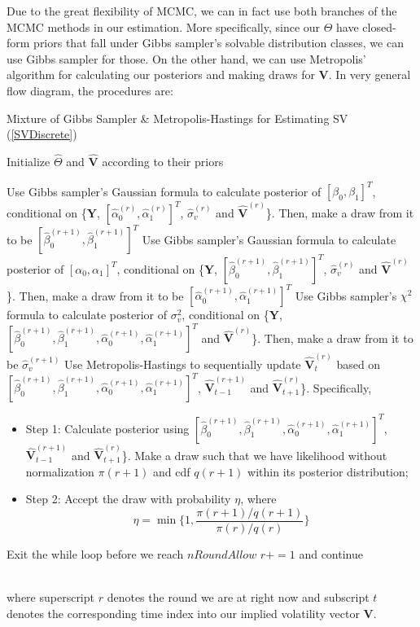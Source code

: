 \documentclass[letterpaper]{article}
\newcommand{\YY}{\mathbf{Y}}
\begin{document}
Due to the great flexibility of MCMC, we can in fact use both branches of the MCMC methods in our estimation. More specifically, since our $\Theta$ have closed-form priors that fall under Gibbs sampler's solvable distribution classes, we can use Gibbs sampler for those. On the other hand, we can use Metropolis' algorithm for calculating our posteriors and making draws for $\mathbf{V}$. In very general flow diagram, the procedures are:
\begin{algorithm}
	\caption{Mixture of Gibbs Sampler \& Metropolis-Hastings for Estimating SV (\ref{SVDiscrete})}
	\Input{Observations $\YY\in\mathbb{R}^{T}$}
	Initialize $\hat{\Theta}$ and $\hat{\mathbf{V}}$ according to their priors\;
	{
		Use Gibbs sampler's Gaussian formula to calculate posterior of $[\beta_0,\beta_1]^T$, conditional on \{$\YY$, $[\hat{\alpha}_0^{(r)},\hat{\alpha}_1^{(r)}]^T$, $\hat{\sigma}_v^{(r)}$ and $\hat{\mathbf{V}}^{(r)}$\}. Then, make a draw from it to be $[\hat{\beta}_0^{(r+1)},\hat{\beta}_1^{(r+1)}]^T$\;
		Use Gibbs sampler's Gaussian formula to calculate posterior of $[\alpha_0,\alpha_1]^T$, conditional on \{$\YY$,  $[\hat{\beta}_0^{(r+1)},\hat{\beta}_1^{(r+1)}]^T$, $\hat{\sigma}_v^{(r)}$ and $\hat{\mathbf{V}}^{(r)}$\}. Then, make a draw from it to be $[\hat{\alpha}_0^{(r+1)},\hat{\alpha}_1^{(r+1)}]^T$\;
		Use Gibbs sampler's $\chi^2$ formula to calculate posterior of $\sigma_v^2$, conditional on \{$\YY$,  $[\hat{\beta}_0^{(r+1)},\hat{\beta}_1^{(r+1)},\hat{\alpha}_0^{(r+1)},\hat{\alpha}_1^{(r+1)}]^T$ and $\hat{\mathbf{V}}^{(r)}$\}. Then, make a draw from it to be $\hat{\sigma}_v^{(r+1)}$\;
		Use Metropolis-Hastings to sequentially update $\hat{\mathbf{V}}^{(r)}_t$ based on $[\hat{\beta}_0^{(r+1)},\hat{\beta}_1^{(r+1)},\hat{\alpha}_0^{(r+1)},\hat{\alpha}_1^{(r+1)}]^T$, $\hat{\mathbf{V}}^{(r+1)}_{t-1}$ and $\hat{\mathbf{V}}^{(r)}_{t+1}$\}.  Specifically, 
		\begin{itemize}
			\item Step 1: Calculate posterior using $[\hat{\beta}_0^{(r+1)},\hat{\beta}_1^{(r+1)},\hat{\alpha}_0^{(r+1)},\hat{\alpha}_1^{(r+1)}]^T$, $\hat{\mathbf{V}}^{(r+1)}_{t-1}$ and $\hat{\mathbf{V}}^{(r)}_{t+1}$\}. Make a draw such that we have likelihood without normalization $\pi(r+1)$ and cdf $q(r+1)$ within its posterior distribution;
			\item Step 2: Accept the draw with probability $\eta$, where
			\begin{equation}
				\eta=\min\{1,\frac{\pi(r+1)/q(r+1)}{\pi(r)/q(r)}\}
			\end{equation}
		\end{itemize}
		{Exit the while loop before we reach $nRoundAllow$\;}
		{$r+=1$ and continue\;}
	}
\end{algorithm}\\
where superscript $r$ denotes the round we are at right now and subscript $t$ denotes the corresponding time index into our implied volatility vector $\mathbf{V}$.
\end{document}
